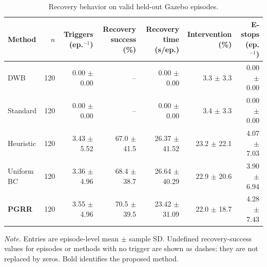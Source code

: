 \begin{table}[t]
\caption{Recovery behavior on valid held-out Gazebo episodes.}
\label{tab:moderate-recovery-results}
\centering
\footnotesize
\setlength{\tabcolsep}{4.0pt}
\renewcommand{\arraystretch}{1.08}
\begin{tabular}{@{}lrrrrrr@{}}
\toprule
Method & $n$ & Triggers (ep.$^{-1}$) & Recovery success (\%)
& Recovery time (s/ep.) & Intervention (\%) & E-stops (ep.$^{-1}$) \\
\midrule
DWB & 120 & 0.00 $\pm$ 0.00 & -- & 0.00 $\pm$ 0.00 & 3.3 $\pm$ 3.3 & 0.00 $\pm$ 0.00 \\
Standard & 120 & 0.00 $\pm$ 0.00 & -- & 0.00 $\pm$ 0.00 & 3.4 $\pm$ 3.3 & 0.00 $\pm$ 0.00 \\
Heuristic & 120 & 3.43 $\pm$ 5.52 & 67.0 $\pm$ 41.5 & 26.37 $\pm$ 41.52 & 23.2 $\pm$ 22.1 & 4.07 $\pm$ 7.03 \\
Uniform BC & 120 & 3.36 $\pm$ 4.96 & 68.4 $\pm$ 38.7 & 26.64 $\pm$ 40.29 & 22.9 $\pm$ 20.6 & 3.90 $\pm$ 6.94 \\
\textbf{PGRR} & 120 & 3.55 $\pm$ 4.96 & 70.5 $\pm$ 39.5 & 23.42 $\pm$ 31.09 & 22.0 $\pm$ 18.7 & 4.28 $\pm$ 7.43 \\
\bottomrule
\end{tabular}
\vspace{2pt}

\parbox{0.98\textwidth}{\footnotesize \emph{Note.} Entries are episode-level mean
$\pm$ sample SD. Undefined recovery-success values for episodes or methods with no trigger are
shown as dashes; they are not replaced by zeros. Bold identifies the proposed method.}
\end{table}
